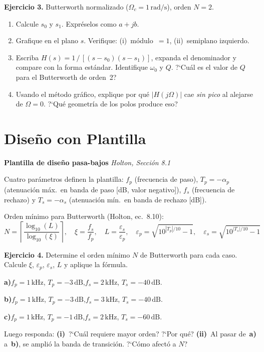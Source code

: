\documentclass[11pt, a4paper]{article}
\begin{document}
\begin{exbox}
\textbf{Ejercicio 3.} Butterworth normalizado ($\Omega_c = 1\,\text{rad/s}$), orden $N = 2$.

\begin{enumerate}[label=\textbf{\alph*)}]
  \item Calcule $s_0$ y $s_1$. Expr\'eselos como $a + jb$.

  \item Grafique en el plano $s$. Verifique: (i)~m\'odulo~$= 1$, (ii)~semiplano izquierdo.

  \item Escriba $H(s) = 1\,/\,[(s-s_0)(s-s_1)]$, expanda el denominador y compare con
  la forma est\'andar. Identifique $\omega_0$ y $Q$.
  ?`Cu\'al es el valor de $Q$ para el Butterworth de orden~2?

  \item Usando el m\'etodo gr\'afico, explique por qu\'e $|H(j\Omega)|$ cae \emph{sin pico}
  al alejarse de $\Omega=0$. ?`Qu\'e geometr\'ia de los polos produce eso?
\end{enumerate}
\end{exbox}

\section{Dise\~no con Plantilla}

\begin{conceptbox}
\textbf{Plantilla de dise\~no pasa-bajos} \hfill \small\textit{Holton, Secci\'on 8.1}

\smallskip
Cuatro par\'ametros definen la plantilla: $f_p$ (frecuencia de paso),
$T_p = -\alpha_p$ (atenuaci\'on m\'ax.\ en banda de paso [dB, valor negativo]),
$f_s$ (frecuencia de rechazo) y $T_s = -\alpha_s$ (atenuaci\'on m\'in.\ en banda de rechazo [dB]).

\smallskip
Orden m\'inimo para Butterworth (Holton, ec.~8.10):
$$N = \left\lceil \frac{\log_{10}(L)}{\log_{10}(\xi)} \right\rceil,
\quad \xi = \frac{f_s}{f_p},\quad L = \frac{\varepsilon_s}{\varepsilon_p},\quad
\varepsilon_p = \sqrt{10^{|T_p|/10}-1},\quad \varepsilon_s = \sqrt{10^{|T_s|/10}-1}$$
\end{conceptbox}

\begin{exbox}
\textbf{Ejercicio 4.} Determine el orden m\'inimo $N$ de Butterworth para cada caso.
Calcule $\xi$, $\varepsilon_p$, $\varepsilon_s$, $L$ y aplique la f\'ormula.

\medskip
\textbf{a)}\quad $f_p = 1\,\text{kHz}$, $T_p = -3\,\text{dB}$,\quad$f_s = 2\,\text{kHz}$, $T_s = -40\,\text{dB}$.

\medskip
\textbf{b)}\quad $f_p = 1\,\text{kHz}$, $T_p = -3\,\text{dB}$,\quad$f_s = 3\,\text{kHz}$, $T_s = -40\,\text{dB}$.

\medskip
\textbf{c)}\quad $f_p = 1\,\text{kHz}$, $T_p = -1\,\text{dB}$,\quad$f_s = 2\,\text{kHz}$, $T_s = -60\,\text{dB}$.

\medskip
Luego responda: \textbf{(i)}~?`Cu\'al requiere mayor orden? ?`Por qu\'e?
\textbf{(ii)}~Al pasar de~\textbf{a)} a~\textbf{b)}, se ampli\'o la banda de transici\'on. ?`C\'omo afect\'o a $N$?
\end{exbox}
\end{document}
